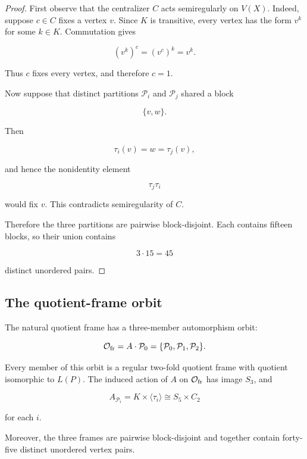 \begin{proof}

First observe that the centralizer \(C\) acts semiregularly on \(V(X)\).
Indeed, suppose \(c\in C\) fixes a vertex \(v\). Since \(K\) is transitive,
every vertex has the form \(v^k\) for some \(k\in K\). Commutation gives

\[
(v^k)^c
=
(v^c)^k
=
v^k.
\]

Thus \(c\) fixes every vertex, and therefore \(c=1\).

Now suppose that distinct partitions \(\mathcal P_i\) and
\(\mathcal P_j\) shared a block

\[
\{v,w\}.
\]

Then

\[
\tau_i(v)=w=\tau_j(v),
\]

and hence the nonidentity element

\[
\tau_j\tau_i
\]

would fix \(v\). This contradicts semiregularity of \(C\).

Therefore the three partitions are pairwise block-disjoint. Each contains
fifteen blocks, so their union contains

\[
3\cdot15=45
\]

distinct unordered pairs.
\end{proof}

\subsection{The quotient-frame orbit}


\begin{theorem}
\label{thm:quotient-frame-orbit}

The natural quotient frame has a three-member automorphism orbit:

\[
\mathcal O_{\mathrm{fr}}
=
A\cdot\mathcal P_0
=
\{
\mathcal P_0,
\mathcal P_1,
\mathcal P_2
\}.
\]

Every member of this orbit is a regular two-fold quotient frame with
quotient isomorphic to \(L(P)\). The induced action of \(A\) on
\(\mathcal O_{\mathrm{fr}}\) has image \(S_3\), and

\[
A_{\mathcal P_i}
=
K\times\langle\tau_i\rangle
\cong
S_5\times C_2
\]

for each \(i\).

Moreover, the three frames are pairwise block-disjoint and together
contain forty-five distinct unordered vertex pairs.
\end{theorem}

